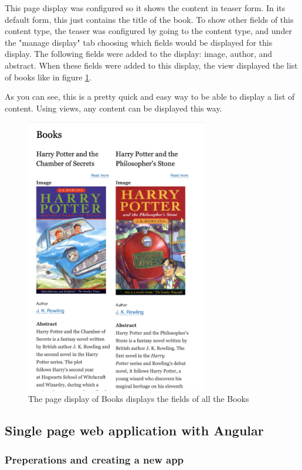 This page display was configured so it shows the content in teaser form. In its default form, this just contains the title of the book. To show other fields of this content type, the teaser was configured by going to the content type, and under the "manage display" tab choosing which fields would be displayed for this display. The following fields were added to the display: image, author, and abstract. When these fields were added to this display, the view displayed the list of books like in figure \ref{fig:Books}.

As you can see, this is a pretty quick and easy way to be able to display a list of content. Using views, any content can be displayed this way.

\begin{figure}[h]
	\centering
	\includegraphics[width=8cm]{./img/Books_Page.png}
	\caption[Display of a list of Books]{The page display of Books displays the fields of all the Books}
	\label{fig:Books}
\end{figure}

\subsection{Single page web application with Angular}

\subsubsection{Preperations and creating a new app}

